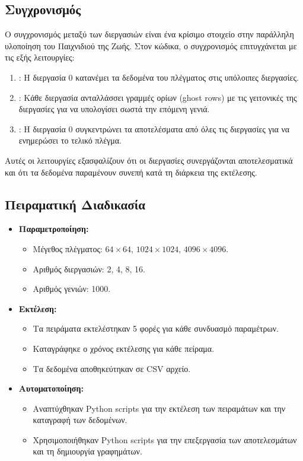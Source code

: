 \documentclass{article}
\begin{document}
\subsection*{Συγχρονισμός}
Ο συγχρονισμός μεταξύ των διεργασιών είναι ένα κρίσιμο στοιχείο στην παράλληλη υλοποίηση του Παιχνιδιού της Ζωής. Στον κώδικα, ο συγχρονισμός επιτυγχάνεται με τις εξής λειτουργίες:
\begin{enumerate}
    \item \textbf{}: Η διεργασία 0 κατανέμει τα δεδομένα του πλέγματος στις υπόλοιπες διεργασίες.
    \item \textbf{}: Κάθε διεργασία ανταλλάσσει γραμμές ορίων (ghost rows) με τις γειτονικές της διεργασίες για να υπολογίσει σωστά την επόμενη γενιά.
    \item \textbf{}: Η διεργασία 0 συγκεντρώνει τα αποτελέσματα από όλες τις διεργασίες για να ενημερώσει το τελικό πλέγμα.
\end{enumerate}
Αυτές οι λειτουργίες εξασφαλίζουν ότι οι διεργασίες συνεργάζονται αποτελεσματικά και ότι τα δεδομένα παραμένουν συνεπή κατά τη διάρκεια της εκτέλεσης.
\subsection*{Πειραματική Διαδικασία}
\begin{itemize}
    \item \textbf{Παραμετροποίηση:}
    \begin{itemize}
        \item Μέγεθος πλέγματος: $64 \times 64$, $1024 \times 1024$, $4096 \times 4096$.
        \item Αριθμός διεργασιών: 2, 4, 8, 16.
        \item Αριθμός γενιών: 1000.
    \end{itemize}
    \item \textbf{Εκτέλεση:}
    \begin{itemize}
        \item Τα πειράματα εκτελέστηκαν 5 φορές για κάθε συνδυασμό παραμέτρων.
        \item Καταγράφηκε ο χρόνος εκτέλεσης για κάθε πείραμα.
        \item Τα δεδομένα αποθηκεύτηκαν σε CSV αρχείο.
    \end{itemize}
    \item \textbf{Αυτοματοποίηση:}
    \begin{itemize}
        \item Αναπτύχθηκαν Python scripts για την εκτέλεση των πειραμάτων και την καταγραφή των δεδομένων.
        \item Χρησιμοποιήθηκαν Python scripts για την επεξεργασία των αποτελεσμάτων και τη δημιουργία γραφημάτων.
    \end{itemize}
\end{itemize}
\end{document}
